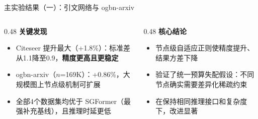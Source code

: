 \documentclass[aspectratio=169,9pt,xcolor=dvipsnames]{beamer}
\newcommand{\highlight}[1]{\textcolor{myred}{\textbf{#1}}}
\newcommand{\blue}[1]{\textcolor{mynavy}{#1}}
\newcommand{\green}[1]{\textcolor{mygreen}{#1}}
\begin{document}
\begin{frame}{主实验结果（一）：引文网络与 ogbn-arxiv}
  \vspace{0.1cm}
  \begin{columns}[T]
    \begin{column}{0.48\textwidth}
      \textbf{\blue{关键发现}}
      \begin{itemize}
        \item Citeseer 提升最大（\green{+1.8\%}）：标准差从1.1降至0.9，\textbf{精度更高且更稳定}
        \item ogbn-arxiv（$n$=169K）：\green{+0.86\%}，大规模图上节点级机制可扩展
        \item 全部4个数据集均优于 SGFormer（最强补充基线），且推理时延更低
      \end{itemize}
    \end{column}
    \begin{column}{0.48\textwidth}
      \textbf{\highlight{核心结论}}
      \begin{itemize}
        \item 节点级自适应正则使精度提升、结果方差下降
        \item 验证了统一预算失配假设：不同节点确实需要差异化稀疏约束
        \item 在保持相同推理接口和复杂度下，改进显著
      \end{itemize}
    \end{column}
  \end{columns}
\end{frame}
\end{document}
